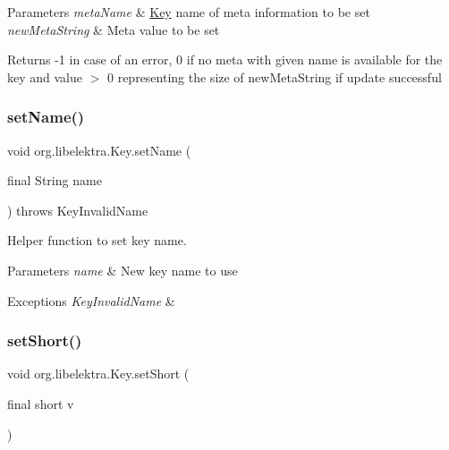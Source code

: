 \begin{DoxyParams}{Parameters}
{\em meta\+Name} & \hyperlink{classorg_1_1libelektra_1_1Key}{Key} name of meta information to be set \\
\hline
{\em new\+Meta\+String} & Meta value to be set \\
\hline
\end{DoxyParams}
\begin{DoxyReturn}{Returns}
-\/1 in case of an error, 0 if no meta with given name is available for the key and value $>$ 0 representing the size of new\+Meta\+String if update successful 
\end{DoxyReturn}
\mbox{\label{classorg_1_1libelektra_1_1Key_abd5602765701a10b6a10887c09810cf5}} 
\subsubsection{\texorpdfstring{set\+Name()}{setName()}}
{\footnotesize\ttfamily void org.\+libelektra.\+Key.\+set\+Name (\begin{DoxyParamCaption}\item[{final String}]{name }\end{DoxyParamCaption}) throws Key\+Invalid\+Name\hspace{0.3cm}{\ttfamily [inline]}}



Helper function to set key name. 


\begin{DoxyParams}{Parameters}
{\em name} & New key name to use \\
\hline
\end{DoxyParams}

\begin{DoxyExceptions}{Exceptions}
{\em Key\+Invalid\+Name} & \\
\hline
\end{DoxyExceptions}
\mbox{\label{classorg_1_1libelektra_1_1Key_ac1621a8d43992b40b6b20a0e45182376}} 
\subsubsection{\texorpdfstring{set\+Short()}{setShort()}}
{\footnotesize\ttfamily void org.\+libelektra.\+Key.\+set\+Short (\begin{DoxyParamCaption}\item[{final short}]{v }\end{DoxyParamCaption})\hspace{0.3cm}{\ttfamily [inline]}}



